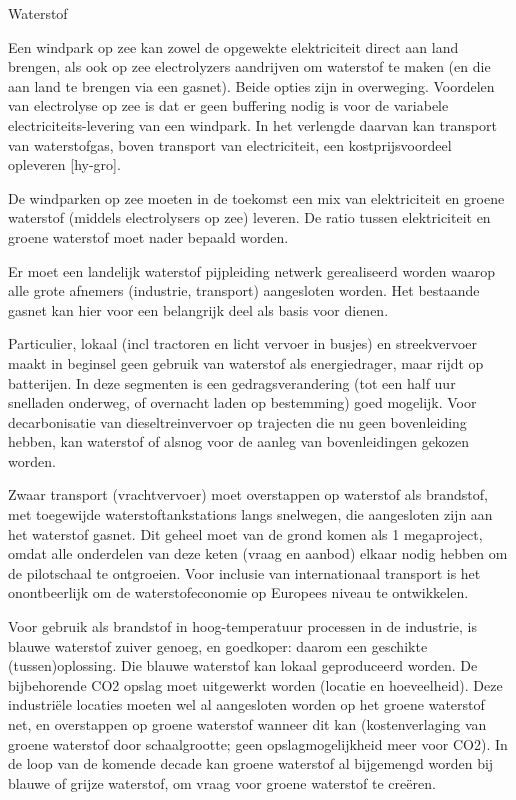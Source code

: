 \begin{voorstel}{Waterstof}
\begin{overwegingen}
Een windpark op zee kan zowel de opgewekte elektriciteit direct aan land brengen, als ook op zee electrolyzers aandrijven om waterstof te maken (en die aan land te brengen via een gasnet). Beide opties zijn in overweging. Voordelen van electrolyse op zee is dat er geen buffering nodig is voor de variabele electriciteits-levering van een windpark. In het verlengde daarvan kan transport van waterstofgas, boven transport van electriciteit, een kostprijsvoordeel opleveren [hy-gro].
\end{overwegingen}

\begin{aanbevelingen}
De windparken op zee moeten in de toekomst een mix van elektriciteit en groene waterstof (middels electrolysers op zee) leveren. De ratio tussen elektriciteit en groene waterstof moet nader bepaald worden.

Er moet een landelijk waterstof pijpleiding netwerk gerealiseerd worden waarop alle grote afnemers (industrie, transport) aangesloten worden. Het bestaande gasnet kan hier voor een belangrijk deel als basis voor dienen. 

Particulier, lokaal (incl tractoren en licht vervoer in busjes) en streekvervoer maakt in beginsel geen gebruik van waterstof als energiedrager, maar rijdt op batterijen. In deze segmenten is een gedragsverandering (tot een half uur snelladen onderweg, of overnacht laden op bestemming) goed mogelijk. Voor decarbonisatie van dieseltreinvervoer op trajecten die nu geen bovenleiding hebben, kan waterstof of alsnog voor de aanleg van bovenleidingen gekozen worden.

Zwaar transport (vrachtvervoer) moet overstappen op waterstof als brandstof, met toegewijde waterstoftankstations langs snelwegen, die aangesloten zijn aan het waterstof gasnet. Dit geheel moet van de grond komen als 1 megaproject, omdat alle onderdelen van deze keten (vraag en aanbod) elkaar nodig hebben om de pilotschaal te ontgroeien. Voor inclusie van internationaal transport is het onontbeerlijk om de waterstofeconomie op Europees niveau te ontwikkelen. 

Voor gebruik als brandstof in hoog-temperatuur processen in de industrie, is blauwe waterstof zuiver genoeg, en goedkoper: daarom een geschikte (tussen)oplossing. Die blauwe waterstof kan lokaal geproduceerd worden. De bijbehorende CO2 opslag moet uitgewerkt worden (locatie en hoeveelheid). Deze industriële locaties moeten wel al aangesloten worden op het groene waterstof net, en overstappen op groene waterstof wanneer dit kan (kostenverlaging van groene waterstof door schaalgrootte; geen opslagmogelijkheid meer voor CO2). In de loop van de komende decade kan groene waterstof al bijgemengd worden bij blauwe of grijze waterstof, om vraag voor groene waterstof te creëren.


\end{aanbevelingen}
\end{voorstel}
